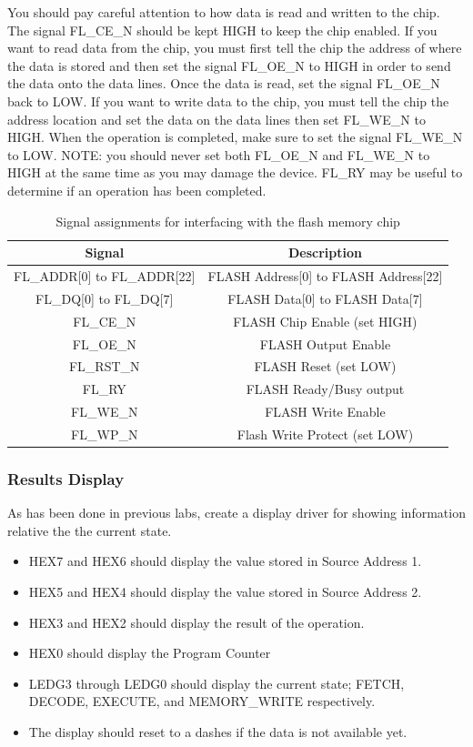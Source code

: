 You should pay careful attention to how data is read and written to the chip. The signal FL\_CE\_N should be kept HIGH to keep the chip enabled. If you want to read data from the chip, you must first tell the chip the address of where the data is stored and then set the signal FL\_OE\_N to HIGH in order to send the data onto the data lines. Once the data is read, set the signal FL\_OE\_N back to LOW. If you want to write data to the chip, you must tell the chip the address location and set the data on the data lines then set FL\_WE\_N to HIGH. When the operation is completed, make sure to set the signal FL\_WE\_N to LOW. NOTE: you should never set both FL\_OE\_N and FL\_WE\_N to HIGH at the same time as you may damage the device. FL\_RY may be useful to determine if an operation has been completed. 

\begin {table}[H]
	\caption {Signal assignments for interfacing with the flash memory chip} 
	\label{tab:flash} 
	\begin{center}
    		\begin{tabular}{ | c | c |}
			\hline
 			{\bf Signal} & {\bf Description} \\ \hline
			FL\_ADDR[0] to FL\_ADDR[22] & FLASH Address[0] to FLASH Address[22] \\ \hline
			FL\_DQ[0] to FL\_DQ[7] & FLASH Data[0] to FLASH Data[7] \\ \hline
			FL\_CE\_N & FLASH Chip Enable (set HIGH)\\ \hline
			FL\_OE\_N & FLASH Output Enable \\ \hline
			FL\_RST\_N & FLASH Reset (set LOW)\\ \hline
			FL\_RY & FLASH Ready/Busy output \\ \hline
			FL\_WE\_N & FLASH Write Enable \\ \hline
			FL\_WP\_N & Flash Write Protect (set LOW)\\ 
			\hline
    		\end{tabular}
	\end{center}
\end{table}

\subsubsection{Results Display}
As has been done in previous labs, create a display driver for showing information relative the the current state.

\begin{itemize}
	\item HEX7 and HEX6 should display the value stored in Source Address 1. 
	\item HEX5 and HEX4 should display the value stored in Source Address 2.
	\item HEX3 and HEX2 should display the result of the operation.
	\item HEX0 should display the Program Counter
	\item LEDG3 through LEDG0 should display the current state; FETCH, DECODE, EXECUTE, and MEMORY\_WRITE respectively. 
	\item The display should reset to a dashes if the data is not available yet.
\end{itemize}


